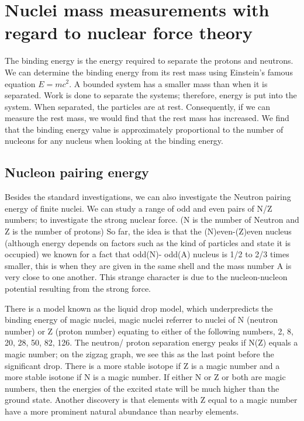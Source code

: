 \section{Nuclei mass measurements with regard to nuclear force theory}
The binding energy is the energy required to separate the protons and neutrons.
We can determine the binding energy from its rest mass using Einstein’s famous equation $E=mc^2$.
A bounded system has a smaller mass than when it is separated.
Work is done to separate the systems; therefore, energy is put into the system.
When separated, the particles are at rest.
Consequently, if we can measure the rest mass, we would find that the rest mass has increased. \cite{noauthor_binding_nodate}
We find that the binding energy value is approximately proportional to the number of nucleons for any nucleus when looking at the binding energy.

\subsection{Nucleon pairing energy}
Besides the standard investigations, we can also investigate the Neutron pairing energy of finite nuclei.
We can study a range of odd and even pairs of N/Z numbers; to investigate the strong nuclear force.
(N is the number of Neutron and Z is the number of protons) \cite{fred_neutron_2019} So far, the idea is that the (N)even-(Z)even nucleus (although energy depends on factors such as the kind of particles and state it is occupied) we known for a fact that odd(N)- odd(A) nucleus is 1/2 to 2/3 times smaller, this is when they are given in the same shell and the mass number A is very close to one another.
This strange character is due to the nucleon-nucleon potential resulting from the strong force. \cite{jensen_elementary_1955}

There is a model known as the liquid drop model, which underpredicts the binding energy of magic nuclei, magic nuclei referrer to nuclei of N (neutron number) or Z (proton number) equating to either of the following numbers, 2, 8, 20, 28, 50, 82, 126.
The neutron/ proton separation energy peaks if N(Z) equals a magic number; on the zigzag graph, we see this as the last point before the significant drop.
There is a more stable isotope if Z is a magic number and a more stable isotone if N is a magic number.
If either N or Z or both are magic numbers, then the energies of the excited state will be much higher than the ground state.
Another discovery is that elements with Z equal to a magic number have a more prominent natural abundance than nearby elements. \cite{kumawat_description_2018}

